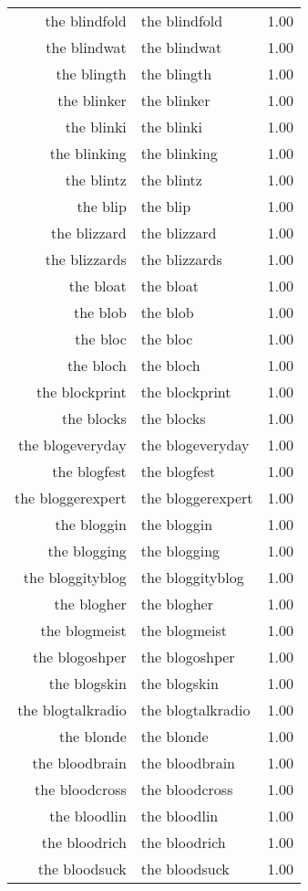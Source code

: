 \begin{table}[ht]
\begin{tabular}{rlr}
  the blindfold & the blindfold & 1.00 \\ 
  the blindwat & the blindwat & 1.00 \\ 
  the blingth & the blingth & 1.00 \\ 
  the blinker & the blinker & 1.00 \\ 
  the blinki & the blinki & 1.00 \\ 
  the blinking & the blinking & 1.00 \\ 
  the blintz & the blintz & 1.00 \\ 
  the blip & the blip & 1.00 \\ 
  the blizzard & the blizzard & 1.00 \\ 
  the blizzards & the blizzards & 1.00 \\ 
  the bloat & the bloat & 1.00 \\ 
  the blob & the blob & 1.00 \\ 
  the bloc & the bloc & 1.00 \\ 
  the bloch & the bloch & 1.00 \\ 
  the blockprint & the blockprint & 1.00 \\ 
  the blocks & the blocks & 1.00 \\ 
  the blogeveryday & the blogeveryday & 1.00 \\ 
  the blogfest & the blogfest & 1.00 \\ 
  the bloggerexpert & the bloggerexpert & 1.00 \\ 
  the bloggin & the bloggin & 1.00 \\ 
  the blogging & the blogging & 1.00 \\ 
  the bloggityblog & the bloggityblog & 1.00 \\ 
  the blogher & the blogher & 1.00 \\ 
  the blogmeist & the blogmeist & 1.00 \\ 
  the blogoshper & the blogoshper & 1.00 \\ 
  the blogskin & the blogskin & 1.00 \\ 
  the blogtalkradio & the blogtalkradio & 1.00 \\ 
  the blonde & the blonde & 1.00 \\ 
  the bloodbrain & the bloodbrain & 1.00 \\ 
  the bloodcross & the bloodcross & 1.00 \\ 
  the bloodlin & the bloodlin & 1.00 \\ 
  the bloodrich & the bloodrich & 1.00 \\ 
  the bloodsuck & the bloodsuck & 1.00 \\ 

\end{tabular}
\end{table}
